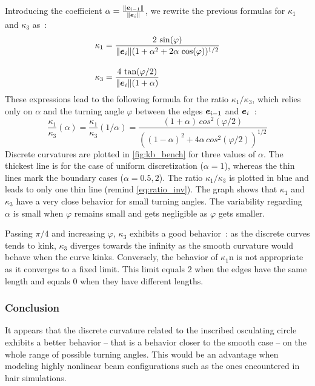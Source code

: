 Introducing the coefficient $\alpha = \frac{\lVert\boldsymbol{e}_{i-1}\rVert}{\lVert\boldsymbol{e}_{i}\rVert}$, we rewrite the previous formulas for $\kappa_1$ and $\kappa_3$ as~:
\begin{equation}
\begin{aligned}
	\kappa_1 &= \frac{2 \,\sin(\varphi)}{\lVert\boldsymbol{e}_{i}\rVert(1+ \alpha^2 + 2 \alpha \, \cos(\varphi))^{1/2}} \\[10pt]
	\kappa_3 &= \frac{4 \,\tan(\varphi/2)}{\lVert\boldsymbol{e}_{i}\rVert(1+\alpha)}
\end{aligned}
\end{equation}
These expressions lead to the following formula for the ratio $\kappa_1 / \kappa_3$, which relies only on $\alpha$ and the turning angle $\varphi$ between the edges $\boldsymbol{e}_{i-1}$ and $\boldsymbol{e}_{i}$~:
\begin{equation}
	\frac{\kappa_1}{\kappa_3}(\alpha) = \frac{\kappa_1}{\kappa_3}(1/\alpha)= \frac{(1+\alpha)\,cos^2(\varphi/2)}{((1- \alpha)^2 + 4 \alpha \, cos^2(\varphi/2))^{1/2}}
	\label{eq:ratio_inv}
\end{equation}
Discrete curvatures are plotted in \cref{fig:kb_bench} for three values of $\alpha$. The thickest line is for the case of uniform discretization ($\alpha=1$), whereas the thin lines mark the boundary cases ($\alpha=0.5,2$). The ratio $\kappa_1/\kappa_3$ is plotted in blue and leads to only one thin line (remind \cref{eq:ratio_inv}). The graph shows that $\kappa_1$ and $\kappa_3$ have a very close behavior for small turning angles. The variability regarding $\alpha$ is small when $\varphi$ remains small and gets negligible as $\varphi$ gets smaller.

Passing $\pi/4$ and increasing $\varphi$, $\kappa_3$ exhibits a good behavior~: as the discrete curves tends to kink, $\kappa_3$ diverges towards the infinity as the smooth curvature would behave when the curve kinks. Conversely, the behavior of $\kappa_1$n is not appropriate as it converges to a fixed limit. This limit equals $2$ when the edges have the same length and equals $0$ when they have different lengths.

\subsubsection{Conclusion}
It appears that the discrete curvature related to the inscribed osculating circle exhibits a better behavior -- that is a behavior closer to the smooth case -- on the whole range of possible turning angles. This would be an advantage when modeling highly nonlinear beam configurations such as the ones encountered in hair simulations. 

